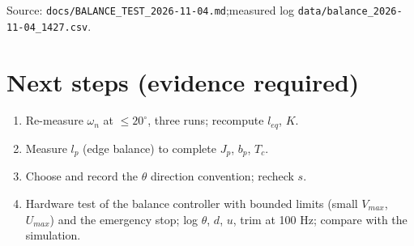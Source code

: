 \documentclass[11pt,a4paper]{article}
\begin{document}
Source: \texttt{docs/BALANCE\_TEST\_2026-11-04.md};\linebreak measured log \texttt{data/balance\_2026-11-04\_1427.csv}.

\section{Next steps (evidence required)}

\begin{enumerate}
\item Re-measure $\omega_n$ at $\le20^\circ$, three runs; recompute $l_{eq}$, $K$.
\item Measure $l_p$ (edge balance) to complete $J_p$, $b_p$, $T_c$.
\item Choose and record the $\theta$ direction convention; recheck $s$.
\item Hardware test of the balance controller with bounded limits (small $V_{max}$, $U_{max}$) and the emergency stop; log $\theta$, $d$, $u$, trim at 100 Hz; compare with the simulation.
\end{enumerate}
\end{document}

